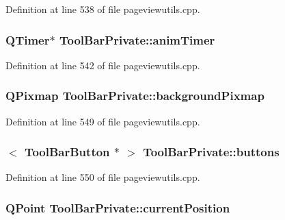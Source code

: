 Definition at line 538 of file pageviewutils.\+cpp.

\hypertarget{classToolBarPrivate_a2786c7b75009e7a8991fdc67a31251e0}{
\subsubsection[{anim\+Timer}]{\setlength{\rightskip}{0pt plus 5cm}Q\+Timer$\ast$ Tool\+Bar\+Private\+::anim\+Timer}}\label{classToolBarPrivate_a2786c7b75009e7a8991fdc67a31251e0}


Definition at line 542 of file pageviewutils.\+cpp.

\hypertarget{classToolBarPrivate_a5f5e42e6d6aebc59080c0f551728cc0b}{
\subsubsection[{background\+Pixmap}]{\setlength{\rightskip}{0pt plus 5cm}Q\+Pixmap Tool\+Bar\+Private\+::background\+Pixmap}}\label{classToolBarPrivate_a5f5e42e6d6aebc59080c0f551728cc0b}


Definition at line 549 of file pageviewutils.\+cpp.

\hypertarget{classToolBarPrivate_a3808da7a9dd822effa1fd0961dc84c0e}{
\subsubsection[{buttons}]{$<$ {\bf Tool\+Bar\+Button} $\ast$ $>$ Tool\+Bar\+Private\+::buttons}}\label{classToolBarPrivate_a3808da7a9dd822effa1fd0961dc84c0e}


Definition at line 550 of file pageviewutils.\+cpp.

\hypertarget{classToolBarPrivate_a6d790f4a41310a7fea33bd59a08df782}{
\subsubsection[{current\+Position}]{\setlength{\rightskip}{0pt plus 5cm}Q\+Point Tool\+Bar\+Private\+::current\+Position}}\label{classToolBarPrivate_a6d790f4a41310a7fea33bd59a08df782}


